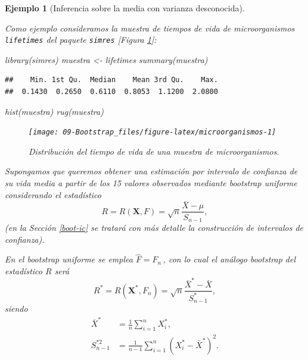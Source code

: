 \documentclass[
]{book}
\newenvironment{Shaded}{\begin{snugshade}}{\end{snugshade}}
\newcommand{\FunctionTok}[1]{\textcolor[rgb]{0.00,0.00,0.00}{#1}}
\newcommand{\NormalTok}[1]{#1}
\newcommand{\OtherTok}[1]{\textcolor[rgb]{0.56,0.35,0.01}{#1}}
\theoremstyle{break}
\newtheorem{example}{Ejemplo}[chapter]
\theoremstyle{nonumberplain}
\begin{document}
\begin{example}[Inferencia sobre la media con varianza desconocida]
\protect\hypertarget{exm:media-dt-desconocida}{}\label{exm:media-dt-desconocida}

Como ejemplo consideramos la muestra de tiempos de vida de microorganismos \texttt{lifetimes} del paquete \texttt{simres} {[}Figura \ref{fig:microorganismos}{]}:

\begin{Shaded}
\begin{Highlighting}[]
\FunctionTok{library}\NormalTok{(simres)}
\NormalTok{muestra }\OtherTok{\textless{}{-}}\NormalTok{ lifetimes}
\FunctionTok{summary}\NormalTok{(muestra)}
\end{Highlighting}
\end{Shaded}

\begin{verbatim}
##    Min. 1st Qu.  Median    Mean 3rd Qu.    Max. 
##  0.1430  0.2650  0.6110  0.8053  1.1200  2.0800
\end{verbatim}

\begin{Shaded}
\begin{Highlighting}[]
\FunctionTok{hist}\NormalTok{(muestra)}
\FunctionTok{rug}\NormalTok{(muestra)}
\end{Highlighting}
\end{Shaded}

\begin{figure}[!htb]

{\centering \texttt{[image: 09-Bootstrap\_files/figure-latex/microorganismos-1]} 

}

\caption{Distribución del tiempo de vida de una muestra de microorganismos.}\label{fig:microorganismos}
\end{figure}

Supongamos que queremos obtener una estimación por intervalo de confianza de su vida media a partir de los 15 valores observados mediante bootstrap uniforme considerando el estadístico
\[R=R\left( \mathbf{X},F \right) =\sqrt{n}\frac{\bar{X}-\mu }{S_{n-1}},\]
(en la Sección \ref{boot-ic} se tratará con más detalle la construcción de intervalos de confianza).

En el bootstrap uniforme se emplea \(\hat{F}=F_n\,\), con lo cual el análogo bootstrap del estadístico \(R\) será
\[R^{\ast}=R\left( \mathbf{X}^{\ast},F_n \right) =\sqrt{n}\frac{\bar{X}^{\ast}-\bar{X}}{S_{n-1}^{\ast}},\]
siendo
\[\begin{aligned}
\bar{X}^{\ast} &= \frac{1}{n}\sum_{i=1}^{n}X_i^{\ast}, \\
S_{n-1}^{\ast 2} &= \frac{1}{n-1}\sum_{i=1}^{n}\left( X_i^{\ast}-
\bar{X}^{\ast} \right)^2.
\end{aligned}\]


\end{example}
\end{document}
